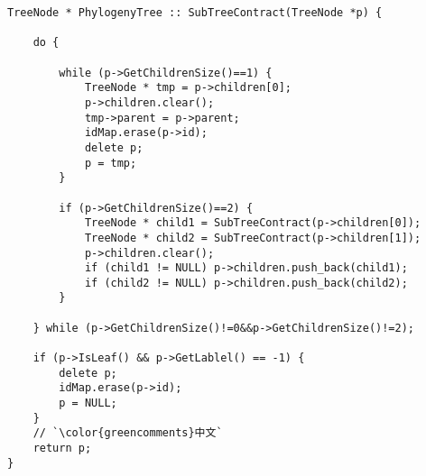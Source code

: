\documentclass[border=6.5mm]{standalone}
\begin{document}
\begin{CJK}{UTF8}{gbsn}
\begin{lstlisting}
TreeNode * PhylogenyTree :: SubTreeContract(TreeNode *p) {
    
    do {
        
        while (p->GetChildrenSize()==1) {
            TreeNode * tmp = p->children[0];
            p->children.clear();
            tmp->parent = p->parent;
            idMap.erase(p->id);
            delete p;
            p = tmp;
        }
        
        if (p->GetChildrenSize()==2) {
            TreeNode * child1 = SubTreeContract(p->children[0]);
            TreeNode * child2 = SubTreeContract(p->children[1]);
            p->children.clear();
            if (child1 != NULL) p->children.push_back(child1);
            if (child2 != NULL) p->children.push_back(child2);
        }
        
    } while (p->GetChildrenSize()!=0&&p->GetChildrenSize()!=2);
    
    if (p->IsLeaf() && p->GetLablel() == -1) {
        delete p;
        idMap.erase(p->id);
        p = NULL;
    }
    // `\color{greencomments}中文`
    return p;
}
\end{lstlisting}
\end{CJK}
\end{document}
